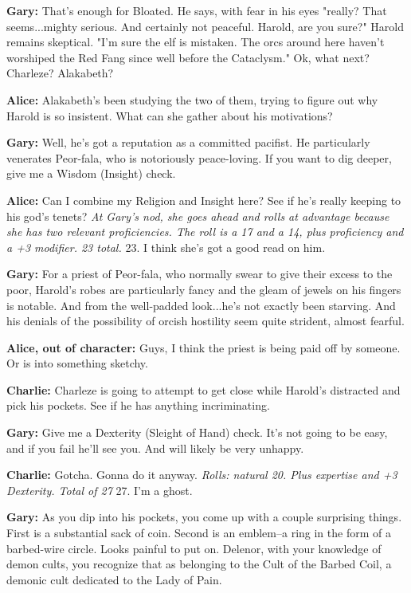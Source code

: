 \textbf{Gary:} That's enough for Bloated. He says, with fear in his eyes "really? That seems...mighty serious. And certainly not peaceful. Harold, are you sure?" Harold remains skeptical. "I'm sure the elf is mistaken. The orcs around here haven't worshiped the Red Fang since well before the Cataclysm." Ok, what next? Charleze? Alakabeth?

\textbf{Alice:} Alakabeth's been studying the two of them, trying to figure out why Harold is so insistent. What can she gather about his motivations?

\textbf{Gary:} Well, he's got a reputation as a committed pacifist. He particularly venerates Peor-fala, who is notoriously peace-loving. If you want to dig deeper, give me a Wisdom (Insight) check.

\textbf{Alice:} Can I combine my Religion and Insight here? See if he's really keeping to his god's tenets? \textit{At Gary's nod, she goes ahead and rolls at advantage because she has two relevant proficiencies. The roll is a 17 and a 14, plus proficiency and a +3 modifier. 23 total.} 23. I think she's got a good read on him.

\textbf{Gary:} For a priest of Peor-fala, who normally swear to give their excess to the poor, Harold's robes are particularly fancy and the gleam of jewels on his fingers is notable. And from the well-padded look...he's not exactly been starving. And his denials of the possibility of orcish hostility seem quite strident, almost fearful.

\textbf{Alice, out of character:} Guys, I think the priest is being paid off by someone. Or is into something sketchy.

\textbf{Charlie:} Charleze is going to attempt to get close while Harold's distracted and pick his pockets. See if he has anything incriminating.

\textbf{Gary:} Give me a Dexterity (Sleight of Hand) check. It's not going to be easy, and if you fail he'll see you. And will likely be very unhappy.

\textbf{Charlie:} Gotcha. Gonna do it anyway. \textit{Rolls: natural 20. Plus expertise and +3 Dexterity. Total of 27} 27. I'm a ghost.

\textbf{Gary:} As you dip into his pockets, you come up with a couple surprising things. First is a substantial sack of coin. Second is an emblem--a ring in the form of a barbed-wire circle. Looks painful to put on. Delenor, with your knowledge of demon cults, you recognize that as belonging to the Cult of the Barbed Coil, a demonic cult dedicated to the Lady of Pain.

